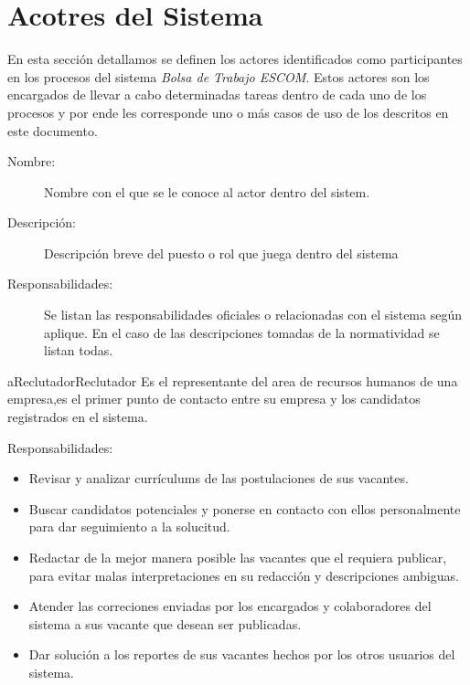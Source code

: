 \chapter{Acotres del Sistema}
En esta sección detallamos se definen los actores identificados como participantes en los procesos del sistema 
\textit{Bolsa de Trabajo ESCOM}. Estos actores son los encargados de llevar a cabo determinadas tareas dentro de cada uno de los 
procesos y por ende les corresponde uno o más casos de uso de los descritos en este documento.


\begin{description}
	\item[Nombre:] Nombre con el que se le conoce al actor dentro del sistem.
	\item[Descripción:] Descripción breve del puesto o rol que juega dentro del sistema
	\item[Responsabilidades:] Se listan las responsabilidades oficiales o relacionadas con el sistema según aplique. En el caso de las descripciones tomadas de la normatividad se listan todas.
\end{description}

\begin{actor}{aReclutador}{Reclutador}{%
   Es el representante del area de recursos humanos de una empresa,es el primer punto de contacto entre su empresa y los candidatos registrados en el sistema.}
    \item[Responsabilidades:] \hfill
    \begin{itemize}
        \item  Revisar y analizar currículums de las postulaciones de sus vacantes.
        \item  Buscar candidatos potenciales y ponerse en contacto con ellos personalmente para dar seguimiento a la solucitud.
        \item  Redactar de la mejor manera posible las vacantes que el requiera publicar, para evitar malas interpretaciones 
        en su redacción y descripciones ambiguas.
        \item  Atender las correciones enviadas por los encargados y colaboradores del sistema a sus vacante que desean ser publicadas.
        \item Dar solución a los reportes de sus vacantes hechos por los otros usuarios del sistema.
    \end{itemize}
\end{actor}


